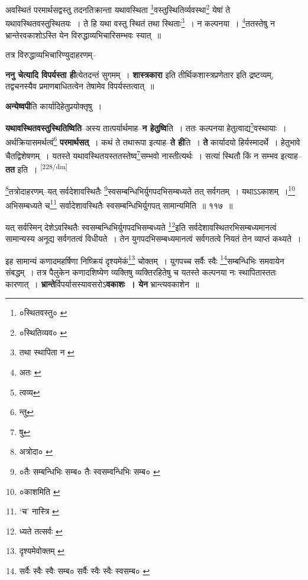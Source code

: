 \documentclass[article,12pt,a4paper]{memoir}
\begin{document}
	  \pstart अवस्थितं परमार्थसद्वस्तु तदनतिक्रान्ता यथावस्थिता \footnote{०स्थितवस्तु० \cite{dp-msC}}वस्तुस्थितिर्व्यवस्था\footnote{०स्थितिव्यव० \cite{dp-msA} \cite{dp-msB} \cite{dp-edP} \cite{dp-edH} \cite{dp-edE}} येषां ते यथावस्थितवस्तुस्थितयः । ते हि यथा वस्तु स्थितं तथा स्थिताः\footnote{तथा स्थापिता न \cite{dp-msC} \cite{dp-msD}} । न कल्पनया । \footnote{अतः \cite{dp-msA} \cite{dp-msB} \cite{dp-edP} \cite{dp-edH} \cite{dp-edE} \cite{dp-edN}}ततस्तेषु न भ्रान्तेरवकाशोऽस्ति येन विरुद्धाव्यभिचारिसम्भवः स्यात् ॥
	\pend
       

	  \pstart तत्र विरुद्धाव्यभिचारिण्युदाहरणम्--
	\pend
      

	  \pstart \textbf{ननु चेत्यादि विपर्यस्ता ही}त्येतदन्तं सुगमम् । \textbf{शास्त्रकारा} इति तीर्थिकशास्त्रप्रणेतार इति द्रष्टव्यम्, तद्वचनस्यैव प्रमाणबाधितत्वेन तेषामेव विपर्यस्तत्वात् ॥
	\pend
      

	  \pstart \textbf{अन्येष्वपी}ति कार्यादिहेतुप्रयोक्तृषु ।
	\pend
      

	  \pstart \textbf{यथावस्थितवस्तुस्थितिष्विति}--अस्य तात्पर्यार्थमाह--\textbf{न हेतुष्वि}ति । ततः कल्पनया हेतुत्वाद्य\footnote{त्वव्य}वस्थायाः । अर्थक्रियासमर्थत्वं\footnote{न्तु} \textbf{परमार्थसत्} । कथं ते तथारूपा इत्याह--\textbf{ते ही}ति । \textbf{ते} कार्यादयो हिर्यस्मादर्थे । हेतुभावे चैतद्विशेषणम् । यतस्ते यथावस्थितयस्ततस्तेष्व\footnote{षु}सम्भवो नास्तीत्यर्थः । सत्यां स्थितौ किं न सम्भव इत्याह--\textbf{तत} इति ।    \leavevmode\textsuperscript{\rmlatinfont\tiny [228/dm]} 
	  
	\footnote{अत्रोदा० \cite{dp-edE}}तत्रोदाहरणम्--यत् सर्वदेशावस्थितैः \footnote{०तैः सम्बन्धिभिः सम्ब० \cite{dp-msC} तैः स्वसम्वन्धिभिः सम्ब० \cite{dp-msB} \cite{dp-edP} \cite{dp-edH} \cite{dp-edN}}स्वसम्बन्धिभिर्युगपदभिसम्बध्यते तत् सर्वगतम् । यथाऽऽकाशम् ।\footnote{०काशमिति \cite{dp-msC}} अभिसम्बध्यते च\footnote{‘च’ नास्त्रि \cite{dp-msB} \cite{dp-edP} \cite{dp-edH} \cite{dp-edE}} सर्वादेशावस्थितैः स्वसम्बन्धिभिर्युगपत् सामान्यमिति ॥ ११७ ॥ 
	  
	यत् सर्वस्मिन् देशेऽवस्थितैः स्वसम्बन्धिभिर्युगपदभिसम्बध्यते \footnote{ध्यते तत्सर्वः \cite{dp-msA} \cite{dp-msB} \cite{dp-edP} \cite{dp-edH} \cite{dp-edE} \cite{dp-edN}}इति सर्वदेशावस्थितरभिसम्बध्यमानत्वं सामान्यस्य अनूद्य सर्वगतत्वं विधीयते । तेन युगपदभिसम्बध्यमानत्वं सर्वगतत्वे नियतं तेन व्याप्तं कथ्यते । 
	  
	इह सामान्यं कणादमहर्षिणा निष्क्रियं दृश्यमेकं\footnote{दृश्यमेवोक्तम् \cite{dp-msB}} चोक्तम् । युगपच्च सर्वैः स्वैः \footnote{सर्वैः स्वैः स्वैः सम्ब० \cite{dp-msA} \cite{dp-edP} \cite{dp-edH} \cite{dp-edE} \cite{dp-edN} सर्वैः स्वैः स्वैः स्वसम्ब० \cite{dp-msB}}सम्बन्धिभिः समवायेन संबद्धम् । तत्र पैलुकेन कणादशिष्येण व्यक्तिषु व्यक्तिरहितेषु च यतस्ते कल्पनया नः स्थापितास्ततः कारणात् । \textbf{भ्रान्ते}र्विपर्यासस्यावसरोऽ\textbf{वकाशः । येन} भ्रान्त्यवकाशेन ॥
	\pend
      
\end{document}
